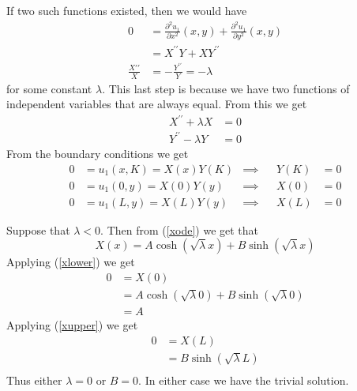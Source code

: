 \documentclass[12pt]{article}
\begin{document}
If two such functions existed, then we would have
\begin{align*}
	0 & = \frac{\partial^2 u_1}{\partial x^2}(x,y) + \frac{\partial^2 u_1}{\partial y^2}(x,y) \\
	& = X^{\prime\prime}Y + XY^{\prime\prime} \\
	\frac{X{\prime\prime}}{X} & = - \frac{Y^{\prime\prime}}{Y}  = -\lambda
\end{align*}
for some constant $\lambda$. This last step is because we have two functions of independent variables that are always equal. From this we get
\begin{align}
	X^{\prime\prime} + \lambda X & = 0 \label{xode} \\
	Y^{\prime\prime} - \lambda Y & = 0 \label{yode}
\end{align}
From the boundary conditions we get
\begin{align}
	0 & = u_1(x,K) = X(x)Y(K) & \implies && Y(K) &= 0 \label{yupper}\\
	0 & = u_1(0,y) = X(0)Y(y) & \implies && X(0) &= 0 \label{xlower}\\
	0 & = u_1(L,y) = X(L)Y(y) & \implies && X(L) &= 0 \label{xupper} 
\end{align}

Suppose that $\lambda < 0$. Then from (\ref{xode}) we get that 
$$
X(x) = A\cosh(\sqrt{\lambda}x) + B \sinh(\sqrt{\lambda}x)
$$
Applying (\ref{xlower}) we get
\begin{align*}
0 & = X(0) \\
& = A\cosh(\sqrt{\lambda}0) + B \sinh(\sqrt{\lambda}0) \\
& = A
\end{align*}
Applying (\ref{xupper}) we get
\begin{align*}
0 & = X(L) \\
& = B \sinh(\sqrt{\lambda}L) \\
\end{align*}
Thus either $\lambda = 0$ or $B = 0$. In either case we have the trivial solution. \bigbreak
\end{document}
